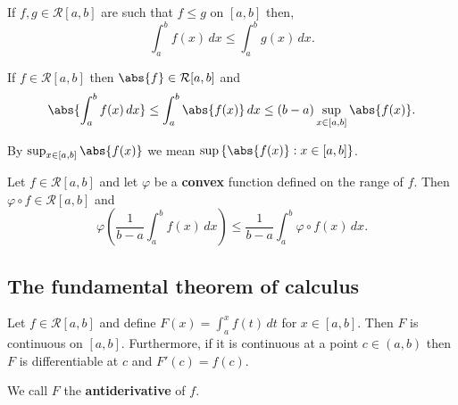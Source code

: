 \documentclass[12pt, a4paper]{article}
\begin{document}
\begin{theorem}
    If \(f,g\in \mathcal{R}[a,b]\) are such that \(f\leq g\) on \([a,b]\) then,
    \[\int_a^b f(x) \, dx \leq \int_a^b g(x) \, dx.\]
\end{theorem}

\begin{mdthm}
    If \(f\in \mathcal{R}[a,b]\) then \(\abs{f} \in \mathcal{R}[a,b]\) and 
    \[\abs{\int_a^b f(x) \, dx} \leq \int_a^b \abs{f(x)} \, dx \leq (b-a) \sup_{x\in[a,b]} \abs{f(x)}.\]
\end{mdthm}

\begin{mdnote}
    By \(\sup_{x\in [a,b]}\abs{f(x)}\) we mean \(\sup\left\{\abs{f(x)} : x\in[a,b]\right\}\).
\end{mdnote}

\begin{mdthm}
    Let \(f \in \mathcal{R}[a,b]\) and let \(\varphi\) be a \textbf{convex} function defined on the range of \(f\). Then \(\varphi \circ f \in \mathcal{R}[a,b]\) and 
    \[\varphi\left( \frac{1}{b-a}\int_a^b f(x) \, dx \right) \leq \frac{1}{b-a} \int_a^b \varphi \circ f(x) \, dx.\]
\end{mdthm}

\subsection{The fundamental theorem of calculus}

\begin{mdthm}
    Let \(f\in \mathcal{R}[a,b]\) and define \(F(x)=\int_a^x f(t)\, dt\) for \(x\in [a,b]\). Then \(F\) is continuous on \([a,b]\). Furthermore, if it is continuous at a point \(c \in (a,b)\) then \(F\) is differentiable at \(c\) and \(F'(c)=f(c)\).
\end{mdthm}

\begin{mdremark}
    We call \(F\) the \textbf{antiderivative} of \(f\).
\end{mdremark}
\end{document}
